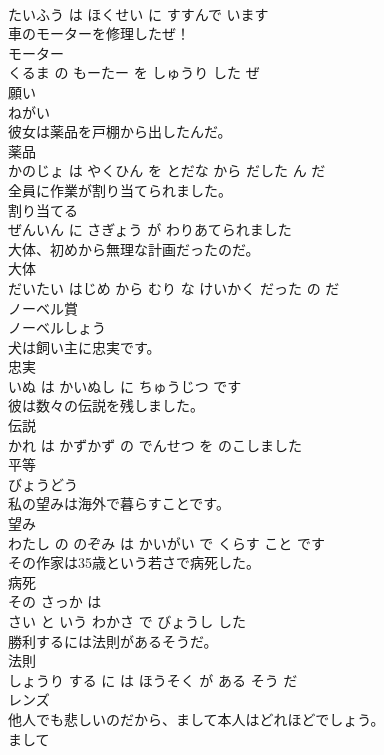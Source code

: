 \documentclass[8pt]{extreport}
\begin{document}
\begin{CJK}{UTF8}{min}
\\	たいふう は ほくせい に すすんで います			
\\	車のモーターを修理したぜ！	
\\	モーター 
\\	くるま の もーたー を しゅうり した ぜ			
\\	願い	
\\	ねがい		
\\	彼女は薬品を戸棚から出したんだ。	
\\	薬品 
\\	かのじょ は やくひん を とだな から だした ん だ			
\\	全員に作業が割り当てられました。	
\\	割り当てる 
\\	ぜんいん に さぎょう が わりあてられました			
\\	大体、初めから無理な計画だったのだ。	
\\	大体 
\\	だいたい はじめ から むり な けいかく だった の だ			
\\	ノーベル賞	
\\	ノーベルしょう		
\\	犬は飼い主に忠実です。	
\\	忠実 
\\	いぬ は かいぬし に ちゅうじつ です			
\\	彼は数々の伝説を残しました。	
\\	伝説 
\\	かれ は かずかず の でんせつ を のこしました			
\\	平等	
\\	びょうどう		
\\	私の望みは海外で暮らすことです。	
\\	望み 
\\	わたし の のぞみ は かいがい で くらす こと です			
\\	その作家は35歳という若さで病死した。	
\\	病死 
\\	その さっか は 
\\	さい と いう わかさ で びょうし した			
\\	勝利するには法則があるそうだ。	
\\	法則 
\\	しょうり する に は ほうそく が ある そう だ			
\\	レンズ	
\\	他人でも悲しいのだから、まして本人はどれほどでしょう。	
\\	まして 

\end{CJK}
\end{document}
